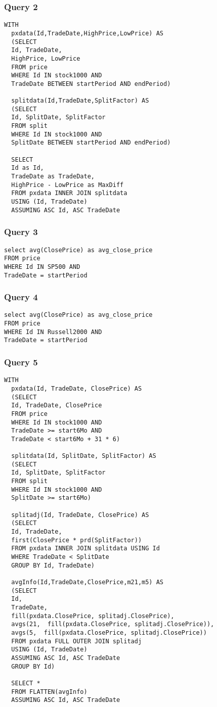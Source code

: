 \documentclass{acm_proc_article-sp}
\begin{document}
\subsubsection{Query 2}
\begin{lstlisting}
WITH
  pxdata(Id,TradeDate,HighPrice,LowPrice) AS
  (SELECT 
  Id, TradeDate, 
  HighPrice, LowPrice 
  FROM price 
  WHERE Id IN stock1000 AND
  TradeDate BETWEEN startPeriod AND endPeriod)
   
  splitdata(Id,TradeDate,SplitFactor) AS 
  (SELECT 
  Id, SplitDate, SplitFactor 
  FROM split 
  WHERE Id IN stock1000 AND 
  SplitDate BETWEEN startPeriod AND endPeriod)
 
  SELECT 
  Id as Id, 
  TradeDate as TradeDate, 
  HighPrice - LowPrice as MaxDiff 
  FROM pxdata INNER JOIN splitdata 
  USING (Id, TradeDate) 
  ASSUMING ASC Id, ASC TradeDate
\end{lstlisting}

\subsubsection{Query 3}
\begin{lstlisting}
select avg(ClosePrice) as avg_close_price 
FROM price 
WHERE Id IN SP500 AND 
TradeDate = startPeriod
\end{lstlisting}

\subsubsection{Query 4}
\begin{lstlisting}
select avg(ClosePrice) as avg_close_price 
FROM price
WHERE Id IN Russell2000 AND 
TradeDate = startPeriod
\end{lstlisting}

\subsubsection{Query 5}
\begin{lstlisting}
WITH
  pxdata(Id, TradeDate, ClosePrice) AS
  (SELECT 
  Id, TradeDate, ClosePrice 
  FROM price 
  WHERE Id IN stock1000 AND
  TradeDate >= start6Mo AND 
  TradeDate < start6Mo + 31 * 6)

  splitdata(Id, SplitDate, SplitFactor) AS 
  (SELECT 
  Id, SplitDate, SplitFactor
  FROM split
  WHERE Id IN stock1000 AND
  SplitDate >= start6Mo)

  splitadj(Id, TradeDate, ClosePrice) AS
  (SELECT 
  Id, TradeDate, 
  first(ClosePrice * prd(SplitFactor))
  FROM pxdata INNER JOIN splitdata USING Id 
  WHERE TradeDate < SplitDate
  GROUP BY Id, TradeDate)
    
  avgInfo(Id,TradeDate,ClosePrice,m21,m5) AS 
  (SELECT 
  Id, 
  TradeDate, 
  fill(pxdata.ClosePrice, splitadj.ClosePrice), 
  avgs(21,  fill(pxdata.ClosePrice, splitadj.ClosePrice)),
  avgs(5,  fill(pxdata.ClosePrice, splitadj.ClosePrice))
  FROM pxdata FULL OUTER JOIN splitadj 
  USING (Id, TradeDate)
  ASSUMING ASC Id, ASC TradeDate
  GROUP BY Id)
   
  SELECT * 
  FROM FLATTEN(avgInfo) 
  ASSUMING ASC Id, ASC TradeDate
\end{lstlisting}
\end{document}
